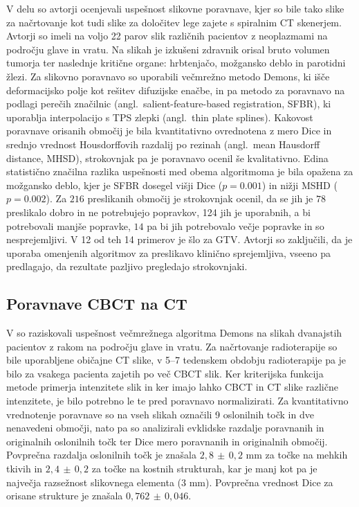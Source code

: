 \documentclass[journal]{IEEEtran}
\begin{document}
V delu \cite{hardcastle2012} so avtorji ocenjevali uspešnost slikovne poravnave, kjer so bile tako slike za načrtovanje kot tudi slike za določitev lege zajete s spiralnim CT skenerjem. Avtorji so imeli na voljo 22 parov slik različnih pacientov z neoplazmami na področju glave in vratu. Na slikah je izkušeni zdravnik orisal bruto volumen tumorja ter naslednje kritične organe: hrbtenjačo, možgansko deblo in parotidni žlezi. Za slikovno poravnavo so uporabili večmrežno metodo Demons\cite{vercauteren2009}, ki išče deformacijsko polje kot rešitev difuzijske enačbe, in pa metodo za poravnavo na podlagi perečih značilnic (angl.~salient-feature-based registration, SFBR), ki uporablja interpolacijo s TPS zlepki (angl.~thin plate splines). Kakovost poravnave orisanih območij je bila kvantitativno ovrednotena z mero Dice in srednjo vrednost Housdorffovih razdalij po rezinah (angl.~mean Hausdorff distance, MHSD), strokovnjak pa je poravnavo ocenil še kvalitativno. Edina statistično značilna razlika uspešnosti med obema algoritmoma je bila opažena za možgansko deblo, kjer je SFBR dosegel višji Dice ($p=0.001$) in nižji MSHD ($p=0.002$). Za $216$ preslikanih območij je strokovnjak ocenil, da se jih je $78$ preslikalo dobro in ne potrebujejo popravkov, 124 jih je uporabnih, a bi potrebovali manjše popravke, $14$ pa bi jih potrebovalo večje popravke in so nesprejemljivi. V 12 od teh 14 primerov je šlo za GTV. Avtorji so zaključili, da je uporaba omenjenih algoritmov za preslikavo klinično sprejemljiva, vseeno pa predlagajo, da rezultate pazljivo pregledajo strokovnjaki.

\subsection{Poravnave CBCT na CT}

V \cite{hou2011} so raziskovali uspešnost večmrežnega algoritma Demons na slikah dvanajstih pacientov z rakom na področju glave in vratu. Za načrtovanje radioterapije so bile uporabljene običajne CT slike, v 5--7 tedenskem obdobju radioterapije pa je bilo za vsakega pacienta zajetih po več CBCT slik. Ker kriterijska funkcija metode primerja intenzitete slik in ker imajo lahko CBCT in CT slike različne intenzitete, je bilo potrebno le te pred poravnavo normalizirati. Za kvantitativno vrednotenje poravnave so na vseh slikah označili 9 oslonilnih točk in dve nenavedeni območji, nato pa so analizirali evklidske razdalje poravnanih in originalnih oslonilnih točk ter Dice mero poravnanih in originalnih območij. Povprečna razdalja oslonilnih točk je znašala $2{,}8\,{\pm}\,0{,}2$ mm za točke na mehkih tkivih in $2{,}4\,{\pm}\,0{,}2$ za točke na kostnih strukturah, kar je manj kot pa je največja razsežnost slikovnega elementa ($3$ mm). Povprečna vrednost Dice za orisane strukture je znašala $0,762\,\pm\,0,046$.
\end{document}
